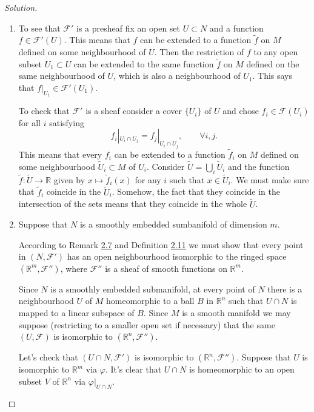 \begin{proof}[Solution]\leavevmode
\begin{enumerate}[label=(\alph*)]
\item To see that $\mathcal{F}'$ is a presheaf fix an open set $U\subset N$ and a function $f \in \mathcal{F}'(U)$. This means that $f$ can be extended to a function $\tilde{f}$ on $M$ defined on some neighbourhood of $U$. Then the restriction of $f $ to any open subset  $U_1 \subset U$ can be extended to the same function \(\tilde{f}\) on $M$ defined on the same neighbourhood of $U$, which is also a neighbourhood of $U_1$. This says that $f|_{U_1}\in\mathcal{F}'(U_1)$.

	To check that $\mathcal{F}'$ is a sheaf consider a cover $ \{ U_i\}$ of $U$ and chose $f_i \in \mathcal{F}(U_i)$ for all $i$ satisfying
	\[f_i|_{U_i\cap U_j}=f_j|_{U_i \cap U_j},\qquad \forall i,j.\]
	This means that every $f_i$ can be extended to a function $\tilde{f}_i$ on $M$ defined on some neighbourhood $\tilde{U}_i \subset M$ of $U_i$. Consider $\tilde{U}=\bigcup_{i} \tilde{U}_i$ and the function $\tilde{f}:\tilde{U}\to \mathbb{R}$ given by $x\mapsto \tilde{f}_i(x)$ for any $i$ such that $x \in \tilde{U}_i$. We must make sure that $\tilde{f}_i$ coincide in the $\tilde{U}_i$. Somehow, the fact that they coincide in the intersection of the sets means that they coincide in the whole \(\tilde{U}\).

	\item Suppose that $N$ is a smoothly embedded sumbanifold of dimension $m$.

According to Remark \hyperref[rk:2.7]{2.7} and Definition \hyperref[def:2.11]{2.11} we must show that every point in \((N,\mathcal{F}')\) has an open neighbourhood isomorphic to the ringed space \((\mathbb{R}^m,\mathcal{F}'')\), where \(\mathcal{F}''\) is a sheaf of smooth functions on \(\mathbb{R}^m\).

	Since $N$ is a smoothly embedded submanifold, at every point of $N$ there is a neighbourhood $U$ of $M$ homeomorphic to a ball $B$ in \(\mathbb{R}^n\) such that \(U \cap N\) is mapped to a linear subspace of \(B\). Since \(M\) is a smooth manifold we may suppose (restricting to a smaller open set if necessary) that the same \((U,\mathcal{F})\) is isomorphic to  \((\mathbb{R}^n,\mathcal{F}'')\).

	Let's check that \((U\cap N, \mathcal{F}')\) is isomorphic to \((\mathbb{R}^n,\mathcal{F}'')\). Suppose that \(U\) is isomorphic to  \(\mathbb{R}^m\) via \(\varphi\). It's clear that \(U \cap N\) is homeomorphic to an open subset \(V\) of \(\mathbb{R}^n\) via \(\varphi|_{U \cap N}\).


\end{enumerate}
\end{proof}
